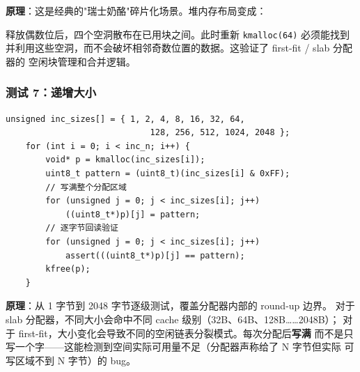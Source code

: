 \textbf{原理}：这是经典的"瑞士奶酪"碎片化场景。堆内存布局变成：

\begin{center}
\end{center}

释放偶数位后，四个空洞散布在已用块之间。此时重新 \texttt{kmalloc(64)} 必须能找到
并利用这些空洞，而不会破坏相邻奇数位置的数据。这验证了 first-fit / slab 分配器的
空闲块管理和合并逻辑。

\subsubsection{测试 7：递增大小}

\begin{lstlisting}[style=cstyle]
    unsigned inc_sizes[] = { 1, 2, 4, 8, 16, 32, 64,
                             128, 256, 512, 1024, 2048 };
    for (int i = 0; i < inc_n; i++) {
        void* p = kmalloc(inc_sizes[i]);
        uint8_t pattern = (uint8_t)(inc_sizes[i] & 0xFF);
        // 写满整个分配区域
        for (unsigned j = 0; j < inc_sizes[i]; j++)
            ((uint8_t*)p)[j] = pattern;
        // 逐字节回读验证
        for (unsigned j = 0; j < inc_sizes[i]; j++)
            assert(((uint8_t*)p)[j] == pattern);
        kfree(p);
    }
\end{lstlisting}

\textbf{原理}：从 1 字节到 2048 字节逐级测试，覆盖分配器内部的 round-up 边界。
对于 slab 分配器，不同大小会命中不同 cache 级别（32B、64B、128B……2048B）；
对于 first-fit，大小变化会导致不同的空闲链表分裂模式。每次分配后\textbf{写满}
而不是只写一个字——这能检测到空间实际可用量不足（分配器声称给了 N 字节但实际
可写区域不到 N 字节）的 bug。

